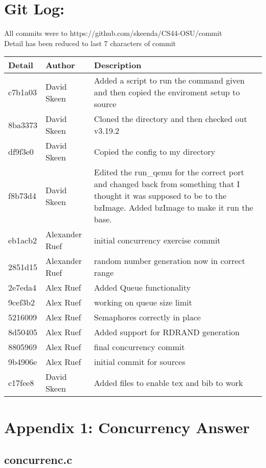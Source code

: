 \documentclass[10pt,drafclsnofoot,onecolumn]{article}
\begin{document}
\section{Git Log:}

All commits were to https://github.com/skeenda/CS44-OSU/commit\\
Detail has been reduced to last 7 characters of commit\\
\begin{tabular}{|p{5cm}|p{5cm}|p{5cm}}\textbf{Detail} & \textbf{Author} & \textbf{Description}\\
\hline
c7b1a03 & David Skeen & Added a script to run the command given and then copied the enviroment setup to source\\\hline
8ba3373 & David Skeen &  Cloned the directory and then checked out v3.19.2\\\hline
df9f3e0 & David Skeen & Copied the config to my directory\\\hline
f8b73d4 & David Skeen &  Edited the run\_qemu for the correct port and changed back from something that I thought it was supposed to be to the bzImage. Added bzImage to make it run the base.\\\hline
eb1acb2 & Alexander Ruef & initial concurrency exercise commit\\\hline
2851d15 & Alexander Ruef & random number generation now in correct range\\\hline
2e7eda4 & Alex Ruef & Added Queue functionality\\\hline
9cef3b2 & Alex Ruef & working on queue size limit\\\hline
5216009 & Alex Ruef & Semaphores correctly in place\\\hline
8d50405 & Alex Ruef & Added support for RDRAND generation\\\hline
8805969 & Alex Ruef & final concurrency commit\\\hline
9b4906e & Alex Ruef & initial commit for sources\\\hline
c17fee8 & David Skeen & Added files to enable tex and bib to work\\\hline
\end{tabular}

\section{Appendix 1: Concurrency Answer}
\subsection{concurrenc.c}
\begin{lstlisting}

 \end{lstlisting}



\end{document}
